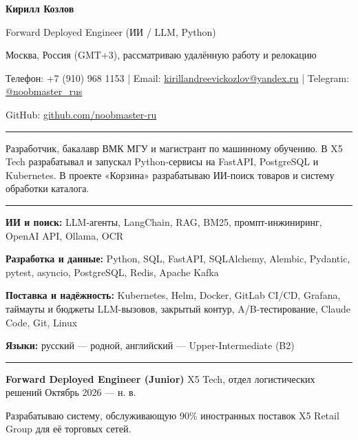\documentclass[10pt,a4paper]{article}
\newcommand{\cvsection}[1]{%
  \vspace{5pt}{\large\bfseries #1}\par\vspace{2pt}\hrule\vspace{3pt}}
\newcommand{\cventry}[3]{%
  \textbf{#1} \textbar{} #3 \textbar{} #2\par\vspace{1pt}}
\begin{document}
{\LARGE\bfseries Кирилл Козлов}\par\vspace{3pt}
Forward Deployed Engineer (ИИ / LLM, Python)\par\vspace{3pt}
Москва, Россия (GMT+3), рассматриваю удалённую работу и релокацию\par
Телефон: +7 (910) 968 1153 | Email: \href{mailto:kirillandreevickozlov@yandex.ru}{kirillandreevickozlov@yandex.ru} | Telegram: \href{https://t.me/noobmaster_rus}{@noobmaster\_rus}\par
GitHub: \href{https://github.com/noobmaster-ru}{github.com/noobmaster-ru}

\cvsection{О себе}
Разработчик, бакалавр ВМК МГУ и магистрант по машинному обучению. В X5 Tech разрабатывал и запускал Python-сервисы на FastAPI, PostgreSQL и Kubernetes. В проекте «Корзина» разрабатываю ИИ-поиск товаров и систему обработки каталога.

\cvsection{Ключевые навыки}
\textbf{ИИ и поиск:} LLM-агенты, LangChain, RAG, BM25, промпт-инжиниринг, OpenAI API, Ollama, OCR\par
\textbf{Разработка и данные:} Python, SQL, FastAPI, SQLAlchemy, Alembic, Pydantic, pytest, asyncio, PostgreSQL, Redis, Apache Kafka\par
\textbf{Поставка и надёжность:} Kubernetes, Helm, Docker, GitLab CI/CD, Grafana, таймауты и бюджеты LLM-вызовов, закрытый контур, A/B-тестирование, Claude Code, Git, Linux\par
\textbf{Языки:} русский --- родной, английский --- Upper-Intermediate (B2)

\cvsection{Опыт работы}
\cventry{Forward Deployed Engineer (Junior)}{Октябрь 2026 --- н. в.}{X5 Tech, отдел логистических решений}
\begin{cvitems}
    \item Разрабатываю систему, обслуживающую 90\% иностранных поставок X5 Retail Group для её торговых сетей.
\end{cvitems}
\vspace{2pt}
\end{document}
